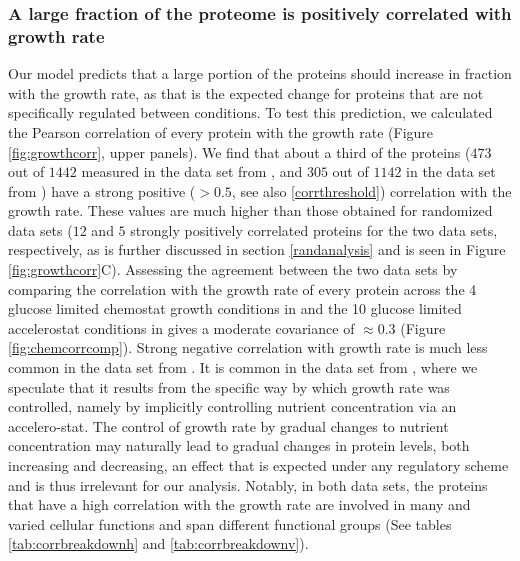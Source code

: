 \documentclass{article}
\newcommand{\hTotal}{$1442$}
\newcommand{\hGlobal}{$473$}
\newcommand{\hGlobalShuff}{$12$}
\newcommand{\vnTotal}{$1142$}
\newcommand{\vTotal}{\vnTotal{}}
\newcommand{\vnGlobalShuff}{$5$}
\newcommand{\vGlobalShuff}{\vnGlobalShuff{}}
\newcommand{\vnGlobal}{$305$}
\newcommand{\vGlobal}{\vnGlobal{}}
\begin{document}
\subsubsection{A large fraction of the proteome is positively correlated with growth rate}
Our model predicts that a large portion of the proteins should increase in fraction with the growth rate, as that is the expected change for proteins that are not specifically regulated between conditions.
To test this prediction, we calculated the Pearson correlation of every protein with the growth rate (Figure \ref{fig:growthcorr}, upper panels).
We find that about a third of the proteins (\hGlobal{} out of \hTotal{} measured in the data set from \cite{Schmidt2015}, and \vGlobal{} out of \vTotal{} in the data set from \cite{Peebo_2015}) have a strong positive ($>0.5$, see also \ref{corrthreshold}) correlation with the growth rate.
These values are much higher than those obtained for randomized data sets (\hGlobalShuff{} and \vGlobalShuff{} strongly positively correlated proteins for the two data sets, respectively, as is further discussed in section \ref{randanalysis} and is seen in Figure \ref{fig:growthcorr}C).
Assessing the agreement between the two data sets by comparing the correlation with the growth rate of every protein across the 4 glucose limited chemostat growth conditions in \cite{Schmidt2015} and the 10 glucose limited accelerostat conditions in \cite{Peebo_2015} gives a moderate covariance of $\approx 0.3$ (Figure \ref{fig:chemcorrcomp}).
Strong negative correlation with growth rate is much less common in the data set from \cite{Schmidt2015}.
It is common in the data set from \cite{Peebo_2015}, where we speculate that it results from the specific way by which growth rate was controlled, namely by implicitly controlling nutrient concentration via an accelero-stat.
The control of growth rate by gradual changes to nutrient concentration may naturally lead to gradual changes in protein levels, both increasing and decreasing, an effect that is expected under any regulatory scheme and is thus irrelevant for our analysis. 
Notably, in both data sets, the proteins that have a high correlation with the growth rate are involved in many and varied cellular functions and span different functional groups (See tables \ref{tab:corrbreakdownh} and \ref{tab:corrbreakdownv}).
\end{document}
